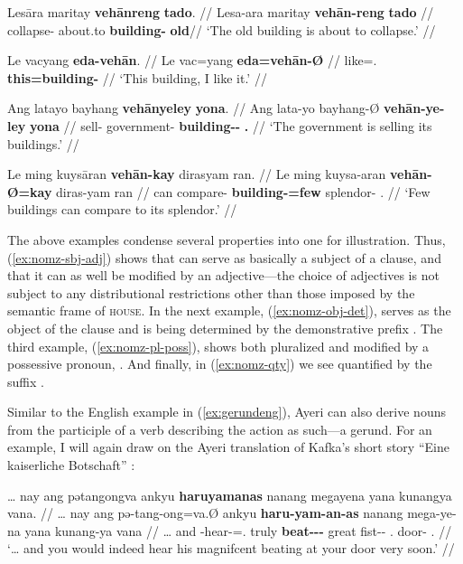 \pex
\a\label{ex:nomz-sbj-adj}\begingl
	\gla Lesāra maritay \textbf{vehānreng} \textbf{tado}. //
	\glb Lesa-ara maritay \textbf{vehān-reng} \textbf{tado} //
	\glc collapse-\TsgI{} about.to \textbf{building-\AargI{}} \textbf{old}//
	\glft `The old building is about to collapse.' //
\endgl

\a\label{ex:nomz-obj-det}\begingl
	\gla Le vacyang \textbf{eda-vehān}. //
	\glb Le vac=yang \textbf{eda=vehān-Ø} //
	\glc \PatTI{} like=\Fsg{}.\Aarg{} \textbf{this=building-\Top{}} //
	\glft `This building, I like it.' //
\endgl

\a\label{ex:nomz-pl-poss}\begingl
	\gla Ang latayo bayhang \textbf{vehānyeley} \textbf{yona}. //
	\glb Ang lata-yo bayhang-Ø \textbf{vehān-ye-ley} \textbf{yona} //
	\glc \AgtT{} sell-\TsgN{} government-\Top{} 
		\textbf{building-\Pl{}-\PargI{}} \textbf{\TsgN{}.\Gen{}} //
	\glft `The government is selling its buildings.' //
\endgl

\a\label{ex:nomz-qty}\begingl
	\gla Le ming kuysāran \textbf{vehān-kay} dirasyam ran. //
	\glb Le ming kuysa-aran \textbf{vehān-Ø=kay} diras-yam ran //
	\glc \PatTI{} can compare-\TplI{} \textbf{building-\Top=few} 
		splendor-\Dat{} \TsgI{}.\Gen{} //
	\glft `Few buildings can compare to its splendor.' //
\endgl
\xe

The above examples condense several properties into one for illustration. Thus, 
(\ref{ex:nomz-sbj-adj}) shows that  can serve as basically 
a subject of a clause, and that it can as well be modified by an 
adjective---the choice of adjectives is not subject to any distributional 
restrictions other than those imposed by the semantic frame of 
\textsc{house}. In the next example, (\ref{ex:nomz-obj-det}), 
 serves as the object of the clause and is being 
determined by the demonstrative prefix . The third 
example, (\ref{ex:nomz-pl-poss}), shows  both pluralized 
and modified by a possessive pronoun, . And finally, in 
(\ref{ex:nomz-qty}) we see  quantified by the suffix 
.

Similar to the English example in (\ref{ex:gerundeng}), Ayeri can also derive 
nouns from the participle of a verb describing the action as such---a gerund. 
For an example, I will again draw on the Ayeri translation of Kafka's short 
story \enquote{Eine kaiserliche Botschaft} \citep[2, 14]{becker:kafka:imperial}:

\ex\label{ex:kafkagerund}\begingl
	\gla … nay ang pətangongva ankyu \textbf{haruyamanas} nanang megayena 
		yana kunangya vana. //
	\glb … nay ang pə-tang-ong=va.Ø ankyu \textbf{haru-yam-an-as} nanang 
		mega-ye-na yana kunang-ya vana //
	\glc … and \AgtT{} \NFut{}-hear-\Irr{}=\Ssg{}.\Top{} truly 
		\textbf{beat-\Ptcp{}-\Nmlz{}-\Parg{}} great fist-\Pl{}-\Gen{} 
		\TsgM{}.\Gen{} door-\Loc{} \Ssg{}.\Gen{} //
	\glft `… and you would indeed hear his magnifcent beating at your door 
		very soon.' //
\endgl\xe

